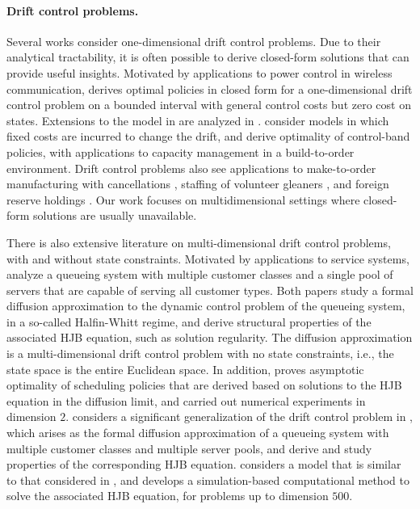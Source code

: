 \documentclass[11pt]{article}
\theoremstyle{definition}
\theoremstyle{plain}
\begin{document}
\paragraph{Drift control problems.} Several works consider one-dimensional drift control problems. 
Due to their analytical tractability, it is often possible to derive closed-form solutions that can provide useful insights. 
Motivated by applications to power control in wireless communication, \cite{AtaHarrisonShepp2005} derives optimal policies in closed form 
for a one-dimensional drift control problem on a bounded interval with general control costs but zero cost on states. 
Extensions to the model in \cite{AtaHarrisonShepp2005} are analyzed in \cite{GhoshWeerasinghe2007,GhoshWeerasinghe2010}. 
\cite{OrmeciMatogluVandeVate2011,VandeVate2021} consider models in which fixed costs are incurred to change the drift, and derive optimality of control-band policies, 
with applications to capacity management in a build-to-order environment. 
Drift control problems also see applications to make-to-order manufacturing with cancellations \cite{RubinoAta2009}, 
staffing of volunteer gleaners \cite{AtaLeeSonmez2019}, and foreign reserve holdings \cite{BarIlanMarionPerry2007}. 
Our work focuses on multidimensional settings where closed-form solutions are usually unavailable. 

There is also extensive literature on multi-dimensional drift control problems, with and without state constraints. Motivated by applications to service systems, 
\cite{atar2004scheduling, harrison2004dynamic} analyze a queueing system with multiple customer classes and a single pool of servers that are capable of serving all customer types. 
Both papers study a formal diffusion approximation to the dynamic control problem of the queueing system, in a so-called Halfin-Whitt regime, and derive structural properties 
of the associated HJB equation, such as solution regularity. The diffusion approximation is a multi-dimensional drift control problem with no state constraints, 
i.e., the state space is the entire Euclidean space. In addition, 
\cite{atar2004scheduling} proves asymptotic optimality of scheduling policies that are derived based on solutions to the HJB equation in the diffusion limit, 
and \cite{harrison2004dynamic} carried out numerical experiments in dimension $2$. 
\cite{Atar2005} considers a significant generalization of the drift control problem in \cite{atar2004scheduling, harrison2004dynamic}, 
which arises as the formal diffusion approximation of a queueing system 
with multiple customer classes and multiple server pools, and derive and study properties of the corresponding HJB equation. 
\cite{AtaKasikaralar2023} considers a model that is similar to that considered in \cite{atar2004scheduling, harrison2004dynamic}, and 
develops a simulation-based computational method to solve the associated HJB equation, for problems up to dimension $500$. 
\end{document}
